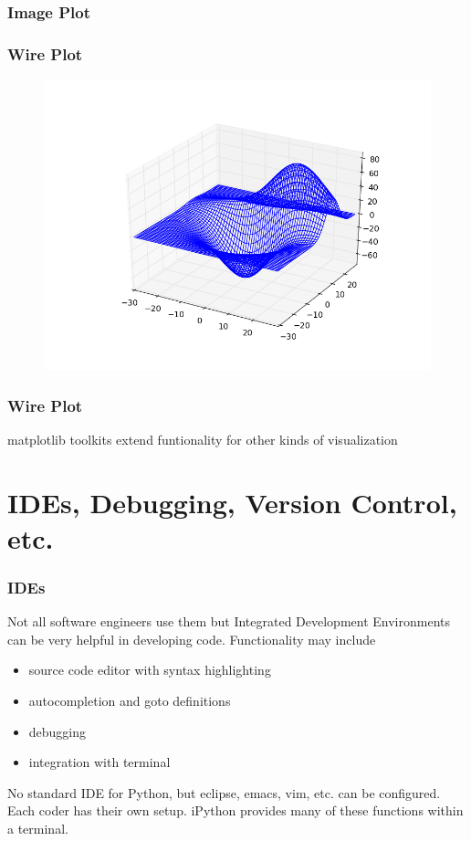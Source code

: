 \documentclass{beamer}
\begin{document}
\begin{frame}
\frametitle{Image Plot}
\end{frame}

\begin{frame}
\frametitle{Wire Plot}
\begin{figure}[h]
\centering
\includegraphics[width=.9\textwidth]{images/wire.png}
\end{figure}
\end{frame}

\begin{frame}
\frametitle{Wire Plot}
matplotlib toolkits extend funtionality for other kinds of visualization
\end{frame}


\section{IDEs, Debugging, Version Control, etc.} 

\begin{frame}
\frametitle{IDEs}
Not all software engineers use them but Integrated Development Environments can be very helpful in developing code. Functionality may include
\begin{itemize}
\setlength{\itemsep}{0.1in}
\item{source code editor with syntax highlighting}
\item{autocompletion and goto definitions}
\item{debugging}
\item{integration with terminal}
\end{itemize}
No standard IDE for Python, but eclipse, emacs, vim, etc. can be configured. Each coder has their own setup. iPython provides many of these functions within a terminal.
\end{frame}
\end{document}
